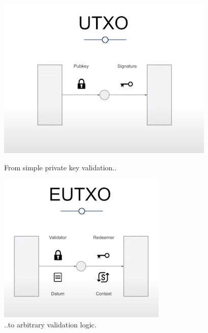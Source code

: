 \documentclass[a4paper,twoside,12pt]{report}
\begin{document}
\begin{figure}[!htb]
   \begin{minipage}{0.48\textwidth}
     \centering
     \includegraphics[width=.85\linewidth]{UTXO}
     \caption{From simple private key validation..}
   \end{minipage}\hfill
   \begin{minipage}{0.48\textwidth}
     \centering
     \includegraphics[width=.7\linewidth]{UTXO_extended}
     \caption{..to arbitrary validation logic.}
   \end{minipage}
\end{figure}
\end{document}
